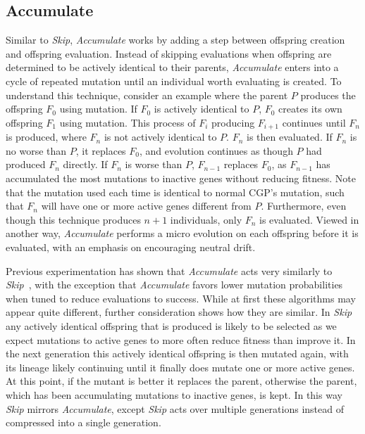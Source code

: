 \documentclass[journal]{IEEEtran}
\begin{document}
\subsection{Accumulate}
Similar to \emph{Skip}, \emph{Accumulate} works by adding a step between offspring
creation and offspring evaluation.  Instead of skipping evaluations when offspring
are determined to be actively identical to their parents, \emph{Accumulate} enters
into a cycle of repeated mutation until an individual worth evaluating is created.
To understand this technique, consider an example where the parent $P$ produces
the offspring $F_0$ using mutation. If $F_0$ is actively identical to $P$, $F_0$
creates its own offspring $F_1$ using mutation.  This process of $F_i$ producing
$F_{i+1}$ continues until $F_n$ is produced, where $F_n$ is not actively identical
to $P$.  $F_n$ is then evaluated.  If $F_n$ is no worse than $P$, it replaces
$F_0$, and evolution continues as though $P$ had produced $F_n$ directly.  If
$F_n$ is worse than $P$, $F_{n-1}$ replaces $F_0$, as $F_{n-1}$ has accumulated
the most mutations to inactive genes without reducing fitness.  Note that
the mutation used each time is identical to normal CGP's mutation, such that
$F_n$ will have one or more active genes different from $P$.  Furthermore, even
though this technique produces $n+1$ individuals, only $F_n$ is evaluated.
Viewed in another way, \emph{Accumulate} performs a micro evolution on each offspring
before it is evaluated, with an emphasis on encouraging neutral drift.

Previous experimentation has shown that \emph{Accumulate} acts very similarly to
\emph{Skip}~\cite{goldman:2013:cgpwaste}, with the exception that \emph{Accumulate}
favors lower mutation probabilities when tuned to reduce evaluations to success. While at first these algorithms may appear
quite different, further consideration shows how they are similar.  In \emph{Skip}
any actively identical offspring that is produced is likely to be selected as we expect mutations to
active genes to more often reduce fitness than improve it.  In the next generation
this actively identical offspring is then mutated again, with its lineage likely
continuing until it finally does mutate one or more active genes.  At this point, if the
mutant is better it replaces the parent, otherwise the parent, which has been accumulating
mutations to inactive genes, is kept.  In this way \emph{Skip} mirrors \emph{Accumulate},
except \emph{Skip} acts over multiple generations instead of compressed into a single generation.
\end{document}
